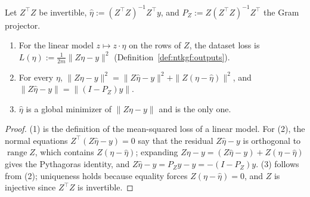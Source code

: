 \begin{theorem}\label{thm:dd:leastSquares}
  \leanok
Let $Z^\top Z$ be invertible, $\hat\eta:=(Z^\top Z)^{-1}Z^\top y$, and $P_Z:=Z(Z^\top Z)^{-1}Z^\top$ the Gram projector.
\begin{enumerate}
  \item For the linear model $z\mapsto z\cdot\eta$ on the rows of $Z$, the dataset loss is
  $L(\eta):=\tfrac1{2m}\|Z\eta-y\|^2$ (Definition~\ref{def:ntkgf:outputs}).
  \item For every $\eta$, $\|Z\eta-y\|^2=\|Z\hat\eta-y\|^2+\|Z(\eta-\hat\eta)\|^2$, and $\|Z\hat\eta-y\|=\|(I-P_Z)y\|$.
  \item $\hat\eta$ is a global minimizer of $\|Z\eta-y\|$ and is the only one.
\end{enumerate}
\end{theorem}

\begin{proof}
  \leanok
(1) is the definition of the mean-squared loss of a linear model. For (2), the normal equations
$Z^\top(Z\hat\eta-y)=0$ say that the residual $Z\hat\eta-y$ is orthogonal to $\operatorname{range}Z$, which contains
$Z(\eta-\hat\eta)$; expanding $Z\eta-y=(Z\hat\eta-y)+Z(\eta-\hat\eta)$ gives the Pythagoras identity, and
$Z\hat\eta-y=P_Zy-y=-(I-P_Z)y$. (3) follows from (2); uniqueness holds because equality forces $Z(\eta-\hat\eta)=0$, and $Z$ is
injective since $Z^\top Z$ is invertible.
\end{proof}

